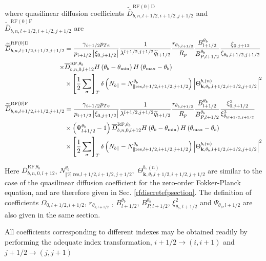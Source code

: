where quasilinear diffusion coefficients $\widetilde{\overline{D}}%
_{b,n,l+1/2,i+1/2,j+1/2}^{\text{RF}(0)\text{D}}$ and $\widetilde{\overline{D}%
}_{b,n,l+1/2,i+1/2,j+1/2}^{\text{RF}(0)\text{F}}$ are
\begin{align}
\widetilde{\overline{D}}_{b,n,l+1/2,i+1/2,j+1/2}^{\text{RF}(0)\text{D}}& =%
\frac{\gamma _{i+1/2}p_{Te}}{p_{i+1/2}\left| \xi _{0,j+1/2}\right| }\frac{1}{%
\lambda ^{l+1/2,j+1/2}\widetilde{q}_{l+1/2}}\frac{r_{\theta _{b,l+1/2}}}{%
R_{p}}\frac{B_{l+1/2}^{\theta _{b}}}{B_{P,l+1/2}^{\theta _{b}}}\frac{\xi
_{0,j+12}}{\xi _{\theta _{b},l+1/2,j+1/2}}  \nonumber \\
\times & \overline{D}_{b,n,0,l+12}^{\text{RF,}\theta _{b}}H\left( \theta
_{b}-\theta _{\min }\right) H\left( \theta _{\max }-\theta _{b}\right)
\nonumber \\
& \times \left[ \frac{1}{2}\sum\limits_{\sigma }\right] _{T}\delta \left(
N_{b\Vert }-N_{\Vert \text{res,}l+1/2,i+1/2,j+1/2}^{\theta _{b}}\right)
\left| \Theta _{\mathbf{k,}\theta _{b}\text{,}l+1/2,i+1/2,j+1/2}^{b,\left(
n\right) }\right| ^{2}
\end{align}
\begin{align}
\widetilde{\overline{D}}_{b,n,l+1/2,i+1/2,j+1/2}^{\text{RF}(0)\text{F}}& =%
\frac{\gamma _{i+1/2}p_{Te}}{p_{i+1/2}\left| \xi _{0,j+1/2}\right| }\frac{1}{%
\lambda ^{l+1/2,j+1/2}\widetilde{q}_{l+1/2}}\frac{r_{\theta _{b,l+1/2}}}{%
R_{p}}\frac{B_{l+1/2}^{\theta _{b}}}{B_{P,l+1/2}^{\theta _{b}}}\frac{\xi
_{0,j+1/2}^{3}}{\xi _{\theta _{bl+1/2,j+1/2}}^{3}}  \nonumber \\
& \times \left( \Psi _{l+1/2}^{\theta _{b}}-1\right) \overline{D}%
_{b,n,0,l+12}^{\text{RF,}\theta _{b}}H\left( \theta _{b}-\theta _{\min
}\right) H\left( \theta _{\max }-\theta _{b}\right)   \nonumber \\
& \times \left[ \frac{1}{2}\sum\limits_{\sigma }\right] _{T}\delta \left(
N_{b\Vert }-N_{\Vert \text{res,}l+1/2,i+1/2,j+1/2}^{\theta _{b}}\right)
\left| \Theta _{\mathbf{k,}\theta _{b}\text{,}l+1/2,i+1/2,j+1/2}^{b,\left(
n\right) }\right| ^{2}
\end{align}

Here $\overline{D}_{b,n,0,l+12}^{\text{RF,}\theta _{b}}$, $N_{\Vert \text{%
res,}l+1/2,i+1/2,j+1/2}^{\theta _{b}},$ $\Theta _{\mathbf{k,}\theta _{b}%
\text{,}l+1/2,i+1/2,j+1/2}^{b,\left( n\right) }$ are similar to the case of
the quasilinear diffusion coefficient for the zero-order Fokker-Planck
equation, and are therefore given in Sec. \ref{rfdiscretefpsection}. The
definition of coefficients $\Omega _{0,l+1/2,i+1/2}$, $r_{\theta _{b,l+1/2}}$%
, $B_{l+1/2}^{\theta _{b}}$, $B_{P,l+1/2}^{\theta _{b}}$, $\xi _{\theta
_{b},l+1/2}^{2}$ and $\Psi _{\theta _{b},l+1/2}$ are also given in the same
section.

All coefficients corresponding to different indexes may be obtained readily
by performing the adequate index transformation, $i+1/2\rightarrow \left(
i,i+1\right) $ and $j+1/2\rightarrow \left( j,j+1\right) $
